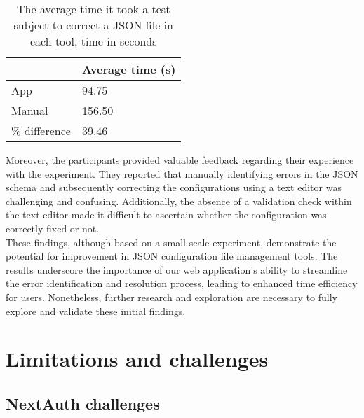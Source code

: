 \begin{table}[!ht]
\centering
\begin{tabular}{|l|l|}
\hline
              & Average time (s) \\ \hline
App           & 94.75            \\ \hline
Manual        & 156.50           \\ \hline
\% difference & 39.46            \\ \hline
\end{tabular}
\caption[Experiment results average time]{The average time it took a test subject to correct a JSON file in each tool, time in seconds}
\label{table:test-results-averages}
\end{table}

\noindent
Moreover, the participants provided valuable feedback regarding their experience with the experiment. They reported that manually identifying errors in the JSON schema and subsequently correcting the configurations using a text editor was challenging and confusing. Additionally, the absence of a validation check within the text editor made it difficult to ascertain whether the configuration was correctly fixed or not. \\

\noindent
These findings, although based on a small-scale experiment, demonstrate the potential for improvement in JSON configuration file management tools. The results underscore the importance of our web application's ability to streamline the error identification and resolution process, leading to enhanced time efficiency for users. Nonetheless, further research and exploration are necessary to fully explore and validate these initial findings. \\


\clearpage %


\section{Limitations and challenges}


\subsection{NextAuth challenges}

